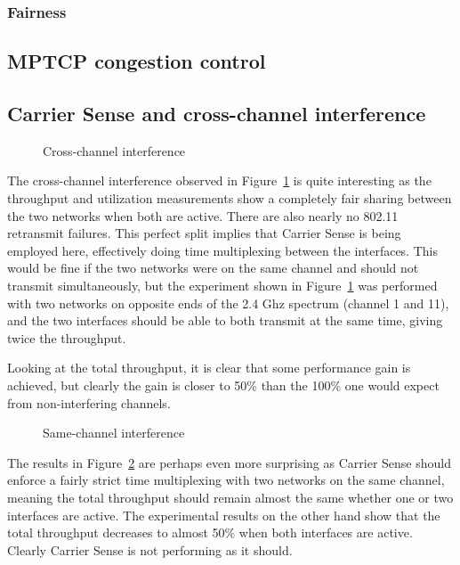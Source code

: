 \documentclass[12pt,a4paper]{article}
\begin{document}
\subsubsection{Fairness}
\subsection{MPTCP congestion control}
\subsection{Carrier Sense and cross-channel interference}
\begin{figure}[h]
 \centering
 
 \caption{Cross-channel interference}\label{graph:cc-interference}
\end{figure}

The cross-channel interference observed in Figure~\ref{graph:cc-interference} is
quite interesting as the throughput and utilization measurements show a
completely fair sharing between the two networks when both are active. There are
also nearly no 802.11 retransmit failures. This perfect split implies that
Carrier Sense is being employed here, effectively doing time multiplexing
between the interfaces.  This would be fine if the two networks were on the same
channel and should not transmit simultaneously, but the experiment shown in
Figure~\ref{graph:cc-interference} was performed with two networks on opposite
ends of the 2.4 Ghz spectrum (channel 1 and 11), and the two interfaces should
be able to both transmit at the same time, giving twice the throughput.

Looking at the total throughput, it is clear that some performance gain is
achieved, but clearly the gain is closer to 50\% than the 100\% one would expect
from non-interfering channels.

\begin{figure}[h]
 \centering
 
 \caption{Same-channel interference}\label{graph:sc-interference}
\end{figure}

The results in Figure~\ref{graph:sc-interference} are perhaps even more
surprising as Carrier Sense should enforce a fairly strict time multiplexing
with two networks on the same channel, meaning the total throughput should
remain almost the same whether one or two interfaces are active. The
experimental results on the other hand show that the total throughput decreases
to almost 50\% when both interfaces are active. Clearly Carrier Sense is not
performing as it should.
\end{document}
